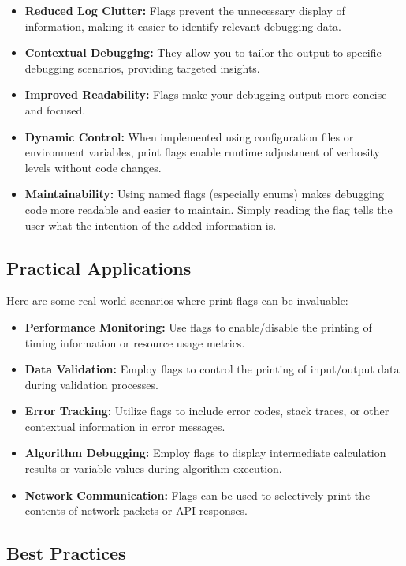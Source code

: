 \documentclass{article}
\begin{document}
{{{\begin{itemize}
    \item \textbf{Reduced Log Clutter:}  Flags prevent the unnecessary display of information, making it easier to identify relevant debugging data.
    \item \textbf{Contextual Debugging:} They allow you to tailor the output to specific debugging scenarios, providing targeted insights.
    \item \textbf{Improved Readability:}  Flags make your debugging output more concise and focused.
    \item \textbf{Dynamic Control:}  When implemented using configuration files or environment variables, print flags enable runtime adjustment of verbosity levels without code changes.
    \item \textbf{Maintainability:}  Using named flags (especially enums) makes debugging code more readable and easier to maintain.  Simply reading the flag tells the user what the intention of the added information is.
\end{itemize}

\subsection*{Practical Applications}

Here are some real-world scenarios where print flags can be invaluable:

\begin{itemize}
    \item \textbf{Performance Monitoring:} Use flags to enable/disable the printing of timing information or resource usage metrics.
    \item \textbf{Data Validation:} Employ flags to control the printing of input/output data during validation processes.
    \item \textbf{Error Tracking:} Utilize flags to include error codes, stack traces, or other contextual information in error messages.
    \item \textbf{Algorithm Debugging:} Employ flags to display intermediate calculation results or variable values during algorithm execution.
    \item \textbf{Network Communication:} Flags can be used to selectively print the contents of network packets or API responses.
\end{itemize}

\subsection*{Best Practices}

}}}
\end{document}
